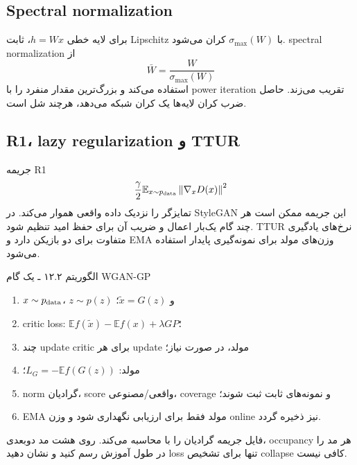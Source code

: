 \documentclass[12pt,openany,oneside]{book}
\newcommand{\E}{\mathbb{E}}
\newcommand{\norm}[1]{\left\lVert #1\right\rVert}
\begin{document}
\subsection{Spectral normalization}
برای لایه خطی $h=W x$، ثابت Lipschitz با $\sigma_{\max}(W)$ کران می‌شود. spectral normalization از
\begin{equation}
 \bar W=\frac{W}{\sigma_{\max}(W)}
\end{equation}
استفاده می‌کند و بزرگ‌ترین مقدار منفرد را با power iteration تقریب می‌زند. حاصل ضرب کران لایه‌ها یک کران شبکه می‌دهد، هرچند شل است.

\subsection{R1، lazy regularization و TTUR}
جریمه R1
\begin{equation}
 \frac\gamma2\E_{x\sim p_{\rm data}}\norm{\nabla_xD(x)}^2
\end{equation}
تمایزگر را نزدیک داده واقعی هموار می‌کند. در StyleGAN این جریمه ممکن است هر چند گام یک‌بار اعمال و ضریب آن برای حفظ امید تنظیم شود.
TTUR نرخ‌های یادگیری متفاوت برای دو بازیکن دارد و EMA وزن‌های مولد برای نمونه‌گیری پایدار استفاده می‌شود.

\begin{algorithmbox}{الگوریتم ۱۲.۲ ـ یک گام WGAN-GP}
\begin{enumerate}
\item $x\sim p_{\rm data}$، $z\sim p(z)$ و $\tilde x=G(z)$؛
\item critic loss: $\E f(\tilde x)-\E f(x)+\lambda GP$؛
\item چند update critic برای هر update مولد، در صورت نیاز؛
\item مولد: $L_G=-\E f(G(z))$؛
\item norm گرادیان، score واقعی/مصنوعی، coverage و نمونه‌های ثابت ثبت شوند؛
\item EMA مولد فقط برای ارزیابی نگهداری شود و وزن online نیز ذخیره گردد.
\end{enumerate}
\end{algorithmbox}

\begin{workshopbox}
\begin{latin}

\end{latin}
فایل  جریمه گرادیان را با  محاسبه می‌کند. روی هشت مد دوبعدی، occupancy هر مد را
در طول آموزش رسم کنید و نشان دهید loss تنها برای تشخیص collapse کافی نیست.
\end{workshopbox}
\end{document}
